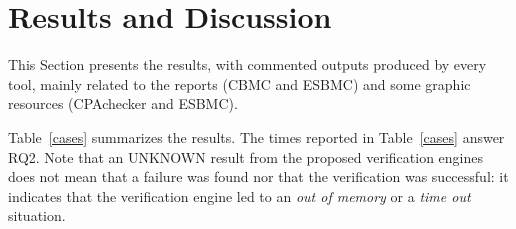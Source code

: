 
\section{Results and Discussion}
\label{sec:results_indeed}

This Section presents the results, with commented outputs produced by every tool, mainly related to the reports (CBMC and ESBMC) and some graphic resources (CPAchecker and ESBMC).

%
Table~\ref{cases} summarizes the results. The times reported in Table~\ref{cases} answer RQ2. 
Note that an UNKNOWN result from the proposed verification engines does not mean that a failure was found nor that the verification was successful: it indicates that the verification engine led to an \textit{out of memory} or a \textit{time out} situation.

